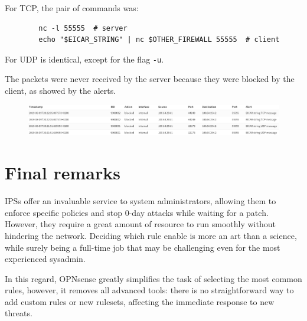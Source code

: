 \documentclass{homework}
\newcommand{\opn}{OPNsense\xspace}
\begin{document}
    For TCP, the pair of commands was:
    \begin{verbatim}
        nc -l 55555  # server
        echo "$EICAR_STRING" | nc $OTHER_FIREWALL 55555  # client
    \end{verbatim}
    For UDP is identical, except for the flag \texttt{-u}.
    
    The packets were never received by the server because they were blocked by the client, as showed by the alerts.
    \begin{figure}[H]
        \centering
        \includegraphics[width=\linewidth]{images/proof}
        \label{fig:proof}
    \end{figure}
    \vspace{-25pt}
    
    
    \section{Final remarks}
    IPSs offer an invaluable service to system administrators, allowing them to enforce specific policies and stop 0-day attacks while waiting for a patch.
    However, they require a great amount of resource to run smoothly without hindering the network.
    Deciding which rule enable is more an art than a science, while surely being a full-time job that may be challenging even for the most experienced sysadmin.
    
    In this regard, \opn greatly simplifies the task of selecting the most common rules, however, it removes all advanced tools: there is no straightforward way to add custom rules or new rulesets, affecting the immediate response to new threats.
\end{document}
